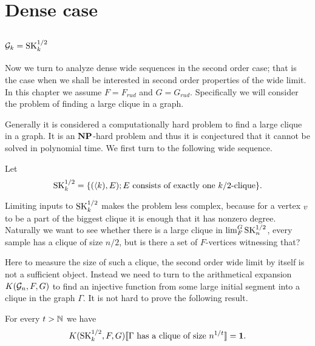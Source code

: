 \chapter{Dense case}\label{chapdense}

\section{$\mathcal{G}_k=\text{SK}_k^{1/2}$}

Now we turn to analyze dense wide sequences in the second order case; that is the case when we shall be interested in second order properties of the wide limit. In this chapter we assume $F=F_{rud}$ and $G=G_{rud}$. Specifically we will consider the problem of finding a large clique in a graph. 

Generally it is considered a computationally hard problem to find a large clique in a graph. It is an $\textbf{NP}$-hard problem and thus it is conjectured that it cannot be solved in polynomial time. We first turn to the following wide sequence.

\begin{defi}
Let \[\text{SK}_k^{1/2}=\{(\langle k),E);\text{$E$ consists of exactly one $k/2$-clique}\}.\]
\end{defi}

Limiting inputs to $\text{SK}_k^{1/2}$ makes the problem less complex, because for a vertex $v$ to be a part of the biggest clique it is enough that it has nonzero degree. Naturally we want to see whether there is a large clique in $\lim_F^G \text{SK}_n^{1/2}$, every sample has a clique of size $n/2$, but is there a set of $F$-vertices witnessing that? 

Here to measure the size of such a clique, the second order wide limit  by itself is not a sufficient object. Instead we need to turn to the arithmetical expansion $K(\mathcal{G}_n,F,G)$ to find an injective function from some large initial segment into a clique in the graph $\Gamma$. It is not hard to prove the following result.

\begin{thrm}\label{thrmsk1}For every $t>\mathbb{N}$ we have
\[K(\text{SK}_k^{1/2},F,G)\llbracket\text{$\Gamma$ has a clique of size $n^{1/t}$}\rrbracket=\textbf{1}.\]

\end{thrm}

